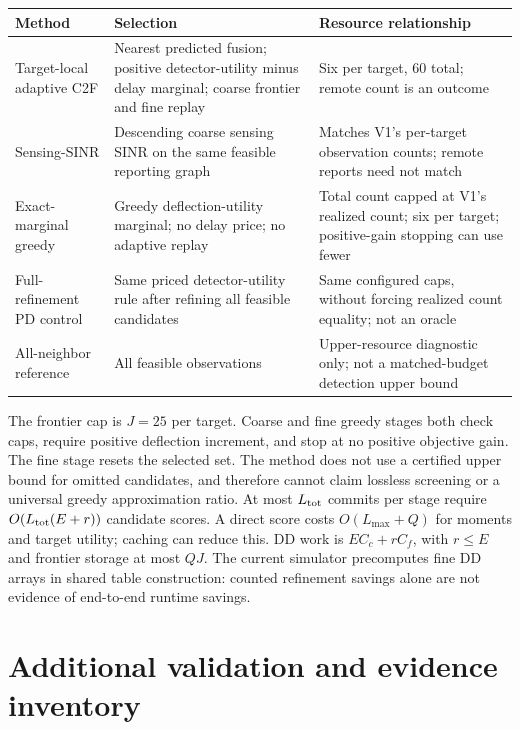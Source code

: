 \documentclass[10pt]{article}
\begin{document}
\begin{center}
\small
\begin{tabular}{p{30mm}p{64mm}p{49mm}}
\toprule
Method & Selection & Resource relationship\\
\midrule
Target-local adaptive C2F &
Nearest predicted fusion; positive detector-utility minus delay marginal;
coarse frontier and fine replay &
Six per target, 60 total; remote count is an outcome\\
Sensing-SINR &
Descending coarse sensing SINR on the same feasible reporting graph &
Matches V1's per-target observation counts; remote reports need not match\\
Exact-marginal greedy &
Greedy deflection-utility marginal; no delay price; no adaptive replay &
Total count capped at V1's realized count; six per target; positive-gain
stopping can use fewer\\
Full-refinement PD control &
Same priced detector-utility rule after refining all feasible candidates &
Same configured caps, without forcing realized count equality; not an oracle\\
All-neighbor reference &
All feasible observations &
Upper-resource diagnostic only; not a matched-budget detection upper bound\\
\bottomrule
\end{tabular}
\end{center}

The frontier cap is $J=25$ per target. Coarse and fine greedy stages both check
caps, require positive deflection increment, and stop at no positive objective
gain. The fine stage resets the selected set. The method does not use a
certified upper bound for omitted candidates, and therefore cannot claim
lossless screening or a universal greedy approximation ratio.
At most $L_{\rm tot}$ commits per stage require
$O(L_{\rm tot}(E+r))$ candidate scores. A direct score costs
$O(L_{\max}+Q)$ for moments and target utility; caching can reduce this.
DD work is $EC_c+rC_f$, with $r\le E$ and frontier storage at most $QJ$.
The current simulator precomputes fine DD arrays in shared table construction:
counted refinement savings alone are not evidence of end-to-end runtime savings.

\section{Additional validation and evidence inventory}
\end{document}
